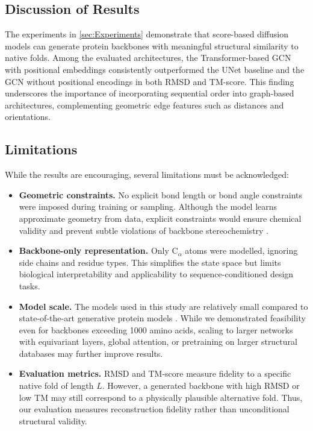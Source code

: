 \documentclass[a4paper,12pt]{article}
\begin{document}
\subsection{Discussion of Results}\label{subsec:discussion-results}
The experiments in \cref{sec:Experiments} demonstrate that score-based diffusion models can generate protein backbones with meaningful structural similarity to native folds. Among the evaluated architectures, the Transformer-based GCN with positional embeddings consistently outperformed the UNet baseline and the GCN without positional encodings in both RMSD and TM-score. This finding underscores the importance of incorporating sequential order into graph-based architectures, complementing geometric edge features such as distances and orientations.

\subsection{Limitations}\label{subsec:limitations}
While the results are encouraging, several limitations must be acknowledged:
\begin{itemize}
    \item \textbf{Geometric constraints.} No explicit bond length or bond angle constraints were imposed during training or sampling. Although the model learns approximate geometry from data, explicit constraints would ensure chemical validity and prevent subtle violations of backbone stereochemistry \citep{branden2012IntroductionProteinStructure,creighton1993proteins,watsonNovoDesignProtein2023}.
    \item \textbf{Backbone-only representation.} Only C\(_\alpha\) atoms were modelled, ignoring side chains and residue types. This simplifies the state space but limits biological interpretability and applicability to sequence-conditioned design tasks.
    \item \textbf{Model scale.} The models used in this study are relatively small compared to state-of-the-art generative protein models \citep{wuProteinStructureGeneration2024,watsonNovoDesignProtein2023}. While we demonstrated feasibility even for backbones exceeding 1000 amino acids, scaling to larger networks with equivariant layers, global attention, or pretraining on larger structural databases may further improve results.
    \item \textbf{Evaluation metrics.} RMSD and TM-score measure fidelity to a specific native fold of length \(L\). However, a generated backbone with high RMSD or low TM may still correspond to a physically plausible alternative fold. Thus, our evaluation measures reconstruction fidelity rather than unconditional structural validity.
\end{itemize}
\end{document}
